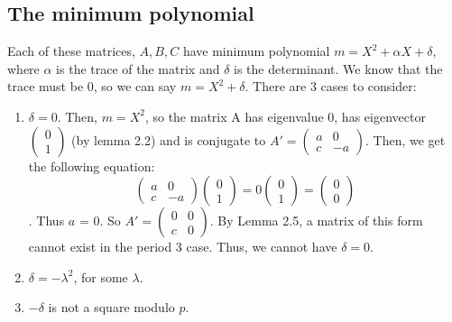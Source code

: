 \documentclass[12pt, letterpaper]{article}
\theoremstyle{definition}
\begin{document}
\subsection{The minimum polynomial}Each of these matrices, $A,B,C$ have minimum polynomial $m = X^2+\alpha X + \delta$, where $\alpha$ is the trace of the matrix and $\delta$ is the determinant. We know that the trace must be 0, so we can say $m=X^2+\delta$.
There are 3 cases to consider:
\begin{enumerate}
\item $\delta = 0$. Then, $m=X^2$, so the matrix A has eigenvalue 0, has eigenvector $\begin{pmatrix} 0 \\ 1\end{pmatrix}$ (by lemma 2.2) and is conjugate to $A'=
\begin{pmatrix}
a & 0 \\
c & -a
\end{pmatrix}.$ Then, we get the following equation:
\begin{equation}
\begin{pmatrix}
a & 0 \\
c & -a
\end{pmatrix}
\begin{pmatrix}
0\\
1
\end{pmatrix}
= 0
\begin{pmatrix}
0\\
1
\end{pmatrix}
=
\begin{pmatrix}
0 \\
0
\end{pmatrix}
\end{equation}. Thus $a$ = 0. So $A' =
\begin{pmatrix}
0 & 0 \\
c & 0
\end{pmatrix}$. By Lemma 2.5, a matrix of this form cannot exist in the period 3 case. Thus, we cannot have $\delta = 0$.

\item $\delta = -\lambda^2$, for some $\lambda$.
\item $-\delta$ is not a square modulo $p$.
\end{enumerate}
\end{document}
